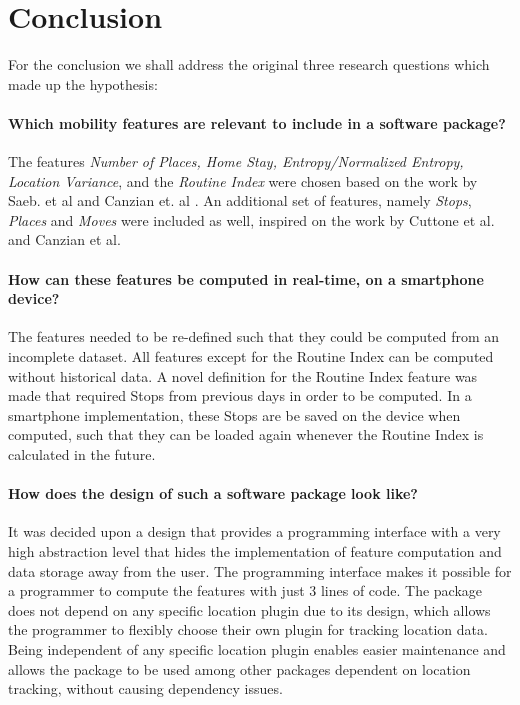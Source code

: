 \chapter{Conclusion}
\label{chapter:08}

For the conclusion we shall address the original three research questions which made up the hypothesis:

\subsubsection*{Which mobility features are relevant to include in a software package?}
The features \textit{Number of Places, Home Stay, Entropy/Normalized Entropy, Location Variance}, and the \textit{Routine Index} were chosen based on the work by Saeb. et al \cite{Saeb2015} and Canzian et. al \cite{Canzian2015}. An additional set of features, namely \textit{Stops}, \textit{Places} and \textit{Moves} were included as well, inspired on the work by Cuttone et al. \cite{sparse-location-2014} and Canzian et al. 

\subsubsection*{How can these features be computed in real-time, on a smartphone device?}
The features needed to be re-defined such that they could be computed from an incomplete dataset. All features except for the Routine Index can be computed without historical data. A novel definition for the Routine Index feature was made that required Stops from previous days in order to be computed. In a smartphone implementation, these Stops are be saved on the device when computed, such that they can be loaded again whenever the Routine Index is calculated in the future.

\subsubsection*{How does the design of such a software package look like?}
It was decided upon a design that provides a programming interface with a very high abstraction level that hides the implementation of feature computation and data storage away from the user. The programming interface makes it possible for a programmer to compute the features with just 3 lines of code. The package does not depend on any specific location plugin due to its design, which allows the programmer to flexibly choose their own plugin for tracking location data. Being independent of any specific location plugin enables easier maintenance and allows the package to be used among other packages dependent on location tracking, without causing dependency issues. 

